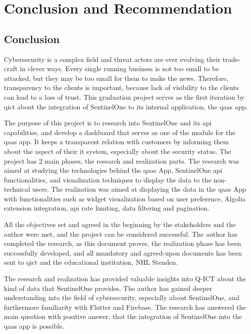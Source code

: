 \chapter{Conclusion and Recommendation}
\section{Conclusion}
Cybersecurity is a complex field and threat actors are ever evolving their trade-craft in clever ways. Every single
running business is not too small to be attacked, but they may be too small for them to make the news. Therefore, transparency
to the clients is important, because lack of visibility to the clients can lead to a loss of trust. This graduation project serves
as the first iteration by \acrshort{qict} about the integration of SentinelOne to its internal application, the \acrshort{qaas} app.

The purpose of this project is to research into SentinelOne and its \acrshort{api} capabilities, and develop a dashboard that
serves as one of the module for the \acrshort{qaas} app. It keeps a transparent relation with customers by informing them about the aspect of
their \acrshort{it} system, especially about the security status. The project has 2 main phases, the research and realization parts.
The research was aimed at studying the technologies behind the \acrshort{qaas} App, SentinelOne \acrshort{api} functionalities, and
visualization techniques to display the data to the non-technical users. The realization was aimed at displaying the data in the \acrshort{qaas}
App with functionalities such as widget visualization based on user preference, Algolia extension integration, \acrshort{api} rate limiting,
data filtering and pagination.

All the objectives set and agreed in the beginning by the stakeholders and the author were met, and the project can be considered successful.
The author has completed the research, as this document proves, the realization phase has been successfully developed, and all mandatory
and agreed-upon documents has been sent to \acrshort{qict} and the educational institution, NHL Stenden.

The research and realization has provided valuable insights into Q-ICT about the kind of data that SentinelOne provides. The author has
gained deeper understanding into the field of cybersecurity, especially about SentinelOne, and furthermore familiarity with Flutter and
Firebase. The research has answered the main question with positive answer, that the integration of SentinelOne into the \acrshort{qaas} app
is possible.

